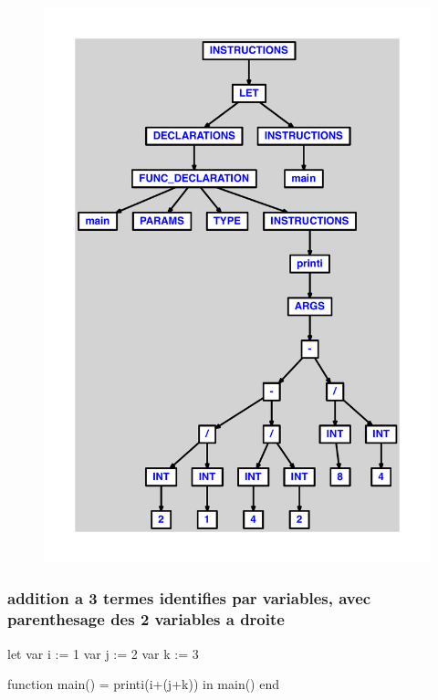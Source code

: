\documentclass{article}
\begin{document}
\begin{figure}[H]\centering\includegraphics[max width=\textwidth]{ast/ast_110.pdf}\end{figure}\subsubsection{addition a 3 termes identifies par variables, avec parenthesage des 2 variables a droite}
\begin{verbatimtab}
let
	var i := 1
	var j := 2
	var k := 3

	function main() = printi(i+(j+k))
in main() end
\end{verbatimtab}
\end{document}
